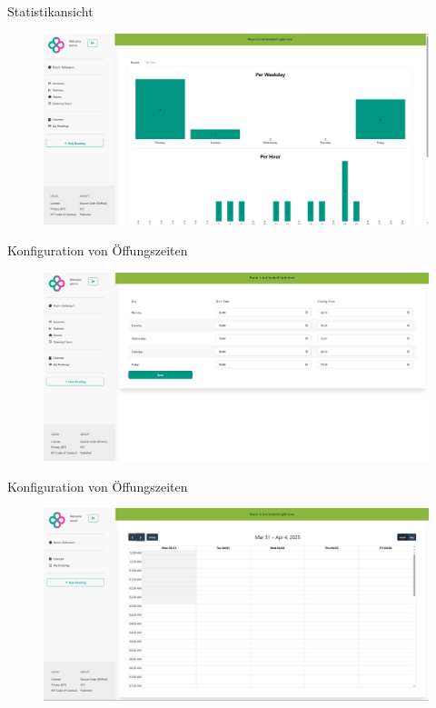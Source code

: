 \begin{frame}{Statistikansicht}
    \thispagestyle{plain}
    \begin{figure}
        \centering
        \includegraphics[width=1\linewidth]{pictures/admin_statistics.png}
        \label{fig:enter-label}
    \end{figure}
\end{frame}

\begin{frame}{Konfiguration von Öffungszeiten}
    \thispagestyle{plain}
    \begin{figure}
        \centering
        \includegraphics[width=1\linewidth]{pictures/admin_opening_hours.png}
        \label{fig:enter-label}
    \end{figure}
\end{frame}

\begin{frame}{Konfiguration von Öffungszeiten}
    \thispagestyle{plain}
    \begin{figure}
        \centering
        \includegraphics[width=1\linewidth]{pictures/admin_opening_hours_calendar.png}
        \label{fig:enter-label}
    \end{figure}
\end{frame}
